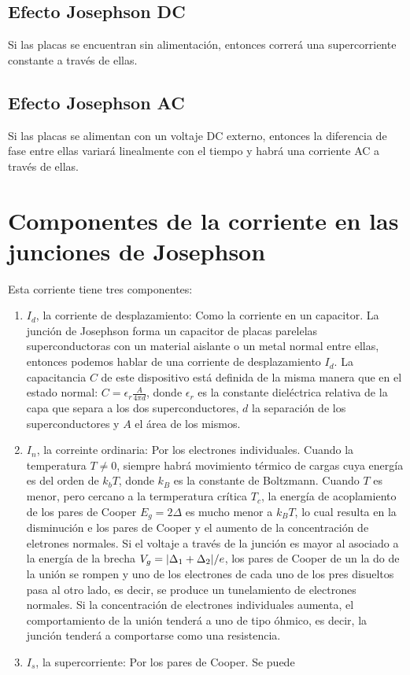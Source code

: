 \subsection{Efecto Josephson DC}

Si las placas se encuentran sin alimentación, entonces correrá una supercorriente constante a través de ellas.

\subsection{Efecto Josephson AC}

Si las placas se alimentan con un voltaje DC externo, entonces la diferencia de fase entre ellas variará linealmente con el tiempo y habrá una corriente AC a través de ellas.

\section{Componentes de la corriente en las junciones de Josephson}

Esta corriente tiene tres componentes:

\begin{enumerate}
    \item $I_d$, la corriente de desplazamiento: Como la corriente en un capacitor. La junción de Josephson forma un capacitor de placas parelelas superconductoras con un material aislante o un metal normal entre ellas, entonces podemos hablar de una corriente de desplazamiento $I_d$. La capacitancia $C$ de este dispositivo está definida de la misma manera que en el estado normal: $C = \epsilon_r \frac{A}{4 \pi d}$, donde $\epsilon_r$ es la constante dieléctrica relativa de la capa que separa a los dos superconductores, $d$ la separación de los superconductores y $A$ el área de los mismos.
    \item $I_n$, la correinte ordinaria: Por los electrones individuales. Cuando la temperatura $T \neq 0$, siempre habrá movimiento térmico de cargas cuya energía es del orden de $k_b T$, donde $k_B$ es la constante de Boltzmann. Cuando $T$ es menor, pero cercano a la termperatura crítica $T_c$, la energía de acoplamiento de los pares de Cooper $E_g = 2 \Delta$ es mucho menor a $k_B T$, lo cual resulta en la disminución e los pares de Cooper y el aumento de la concentración de eletrones normales. Si el voltaje a través de la junción es mayor al asociado a la energía de la brecha $V_g = \abs{\Delta_1 + \Delta_2}/e$, los pares de Cooper de un la do de la unión se rompen y uno de los electrones de cada uno de los pres disueltos pasa al otro lado, es decir, se produce un tunelamiento de electrones normales. Si la concentración de electrones individuales aumenta, el comportamiento de la unión tenderá a uno de tipo óhmico, es decir, la junción tenderá a comportarse como una resistencia.
    \item $I_s$, la supercorriente: Por los pares de Cooper. Se puede 
\end{enumerate}

